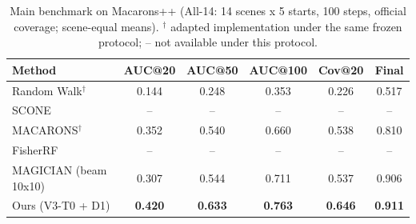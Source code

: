 \begin{table}[t]
\centering
\small
\begin{tabular}{lccccc}
\toprule
Method & AUC@20 & AUC@50 & AUC@100 & Cov@20 & Final \\
\midrule
Random Walk$^{\dagger}$ & 0.144 & 0.248 & 0.353 & 0.226 & 0.517 \\
SCONE & -- & -- & -- & -- & -- \\
MACARONS$^{\dagger}$ & 0.352 & 0.540 & 0.660 & 0.538 & 0.810 \\
FisherRF & -- & -- & -- & -- & -- \\
MAGICIAN (beam 10x10) & 0.307 & 0.544 & 0.711 & 0.537 & 0.906 \\
Ours (V3-T0 + D1) & \textbf{0.420} & \textbf{0.633} & \textbf{0.763} & \textbf{0.646} & \textbf{0.911} \\
\bottomrule
\end{tabular}
\caption{Main benchmark on Macarons++ (All-14: 14 scenes x 5 starts, 100 steps, official coverage; scene-equal means). $^{\dagger}$ adapted implementation under the same frozen protocol; -- not available under this protocol.}
\label{tab:main}
\end{table}
